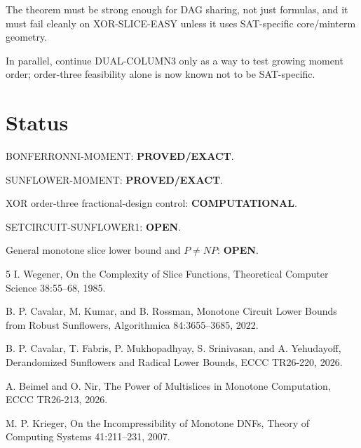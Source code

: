 \documentclass[11pt]{article}
\begin{document}
The theorem must be strong enough for DAG sharing, not just formulas, and it
must fail cleanly on XOR-SLICE-EASY unless it uses SAT-specific core/minterm
geometry.

In parallel, continue DUAL-COLUMN3 only as a way to test growing moment order;
order-three feasibility alone is now known not to be SAT-specific.

\section{Status}

BONFERRONNI-MOMENT: \textbf{PROVED/EXACT}.

SUNFLOWER-MOMENT: \textbf{PROVED/EXACT}.

XOR order-three fractional-design control: \textbf{COMPUTATIONAL}.

SETCIRCUIT-SUNFLOWER1: \textbf{OPEN}.

General monotone slice lower bound and \(P\ne NP\): \textbf{OPEN}.

\begin{thebibliography}{5}
I. Wegener,
On the Complexity of Slice Functions,
Theoretical Computer Science 38:55--68, 1985.

B. P. Cavalar, M. Kumar, and B. Rossman,
Monotone Circuit Lower Bounds from Robust Sunflowers,
Algorithmica 84:3655--3685, 2022.

B. P. Cavalar, T. Fabris, P. Mukhopadhyay, S. Srinivasan, and A. Yehudayoff,
Derandomized Sunflowers and Radical Lower Bounds,
ECCC TR26-220, 2026.

A. Beimel and O. Nir,
The Power of Multislices in Monotone Computation,
ECCC TR26-213, 2026.

M. P. Krieger,
On the Incompressibility of Monotone DNFs,
Theory of Computing Systems 41:211--231, 2007.
\end{thebibliography}
\end{document}

